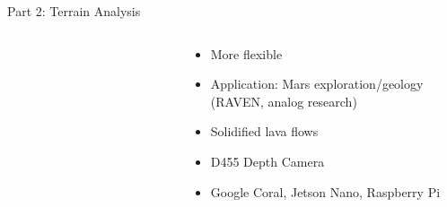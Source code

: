 \documentclass[aspectratio=169]{beamer}
\newif\ifpause
\newcommand{\mypause}{\ifpause \pause \fi}
\begin{document}
\begin{frame}{Part 2: Terrain Analysis}
\begin{columns}
\begin{column}{0.37\textwidth}
\begin{figure}[]
\begin{subfigure}[b]{0.9\linewidth}
		    \end{subfigure}
		\end{figure}
        \end{column}
        \begin{column}{0.6\textwidth}
		\begin{itemize}
			\item More flexible
			\mypause
			\item Application: Mars exploration/geology\mypause\\(RAVEN, analog research)
			\item Solidified lava flows
			\mypause
			\item D455 Depth Camera
			\item Google Coral, Jetson Nano, Raspberry Pi
		\end{itemize}
        \end{column}
    \end{columns}
\end{frame}
\end{document}
